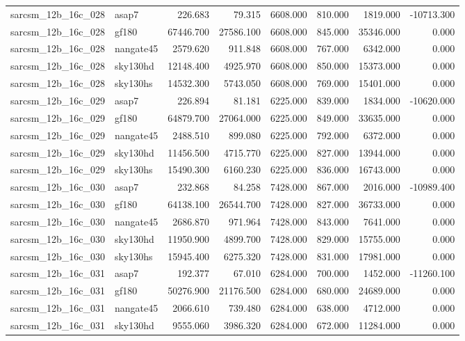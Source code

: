 \begin{tabular}{llrrrrrr}
sarcsm\_12b\_16c\_028 & asap7 & 226.683 & 79.315 & 6608.000 & 810.000 & 1819.000 & -10713.300 \\
sarcsm\_12b\_16c\_028 & gf180 & 67446.700 & 27586.100 & 6608.000 & 845.000 & 35346.000 & 0.000 \\
sarcsm\_12b\_16c\_028 & nangate45 & 2579.620 & 911.848 & 6608.000 & 767.000 & 6342.000 & 0.000 \\
sarcsm\_12b\_16c\_028 & sky130hd & 12148.400 & 4925.970 & 6608.000 & 850.000 & 15373.000 & 0.000 \\
sarcsm\_12b\_16c\_028 & sky130hs & 14532.300 & 5743.050 & 6608.000 & 769.000 & 15401.000 & 0.000 \\
sarcsm\_12b\_16c\_029 & asap7 & 226.894 & 81.181 & 6225.000 & 839.000 & 1834.000 & -10620.000 \\
sarcsm\_12b\_16c\_029 & gf180 & 64879.700 & 27064.000 & 6225.000 & 849.000 & 33635.000 & 0.000 \\
sarcsm\_12b\_16c\_029 & nangate45 & 2488.510 & 899.080 & 6225.000 & 792.000 & 6372.000 & 0.000 \\
sarcsm\_12b\_16c\_029 & sky130hd & 11456.500 & 4715.770 & 6225.000 & 827.000 & 13944.000 & 0.000 \\
sarcsm\_12b\_16c\_029 & sky130hs & 15490.300 & 6160.230 & 6225.000 & 836.000 & 16743.000 & 0.000 \\
sarcsm\_12b\_16c\_030 & asap7 & 232.868 & 84.258 & 7428.000 & 867.000 & 2016.000 & -10989.400 \\
sarcsm\_12b\_16c\_030 & gf180 & 64138.100 & 26544.700 & 7428.000 & 827.000 & 36733.000 & 0.000 \\
sarcsm\_12b\_16c\_030 & nangate45 & 2686.870 & 971.964 & 7428.000 & 843.000 & 7641.000 & 0.000 \\
sarcsm\_12b\_16c\_030 & sky130hd & 11950.900 & 4899.700 & 7428.000 & 829.000 & 15755.000 & 0.000 \\
sarcsm\_12b\_16c\_030 & sky130hs & 15945.400 & 6275.320 & 7428.000 & 831.000 & 17981.000 & 0.000 \\
sarcsm\_12b\_16c\_031 & asap7 & 192.377 & 67.010 & 6284.000 & 700.000 & 1452.000 & -11260.100 \\
sarcsm\_12b\_16c\_031 & gf180 & 50276.900 & 21176.500 & 6284.000 & 680.000 & 24689.000 & 0.000 \\
sarcsm\_12b\_16c\_031 & nangate45 & 2066.610 & 739.480 & 6284.000 & 638.000 & 4712.000 & 0.000 \\
sarcsm\_12b\_16c\_031 & sky130hd & 9555.060 & 3986.320 & 6284.000 & 672.000 & 11284.000 & 0.000 \\

\end{tabular}
